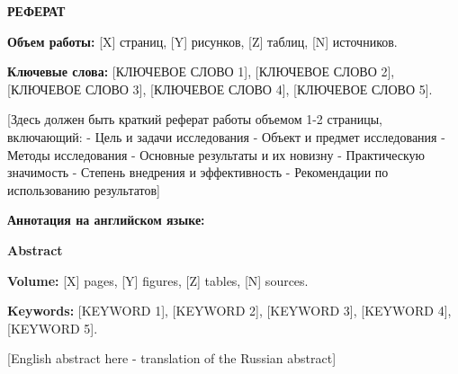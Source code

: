 \begin{center}
    \textbf{РЕФЕРАТ}
\end{center}

\vspace{1cm}

\textbf{Объем работы:} [X] страниц, [Y] рисунков, [Z] таблиц, [N] источников.

\textbf{Ключевые слова:} [КЛЮЧЕВОЕ СЛОВО 1], [КЛЮЧЕВОЕ СЛОВО 2], [КЛЮЧЕВОЕ СЛОВО 3], [КЛЮЧЕВОЕ СЛОВО 4], [КЛЮЧЕВОЕ СЛОВО 5].

\vspace{1cm}

[Здесь должен быть краткий реферат работы объемом 1-2 страницы, включающий:
- Цель и задачи исследования
- Объект и предмет исследования  
- Методы исследования
- Основные результаты и их новизну
- Практическую значимость
- Степень внедрения и эффективность
- Рекомендации по использованию результатов]

\vspace{1cm}

\textbf{Аннотация на английском языке:}

\textbf{Abstract}

\textbf{Volume:} [X] pages, [Y] figures, [Z] tables, [N] sources.

\textbf{Keywords:} [KEYWORD 1], [KEYWORD 2], [KEYWORD 3], [KEYWORD 4], [KEYWORD 5].

\vspace{1cm}

[English abstract here - translation of the Russian abstract]

\newpage
